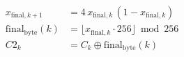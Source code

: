 \documentclass[preview,border=4pt]{standalone}
\begin{document}
\begin{align}
x_{\mathrm{final},k+1} &= 4\,x_{\mathrm{final},k}\,(1-x_{\mathrm{final},k}) \\
\mathrm{final}_{\mathrm{byte}}(k) &= \lfloor x_{\mathrm{final},k} \cdot 256 \rfloor \bmod 256 \\
C2_k &= C_k \oplus \mathrm{final}_{\mathrm{byte}}(k)
\end{align}
\end{document}
